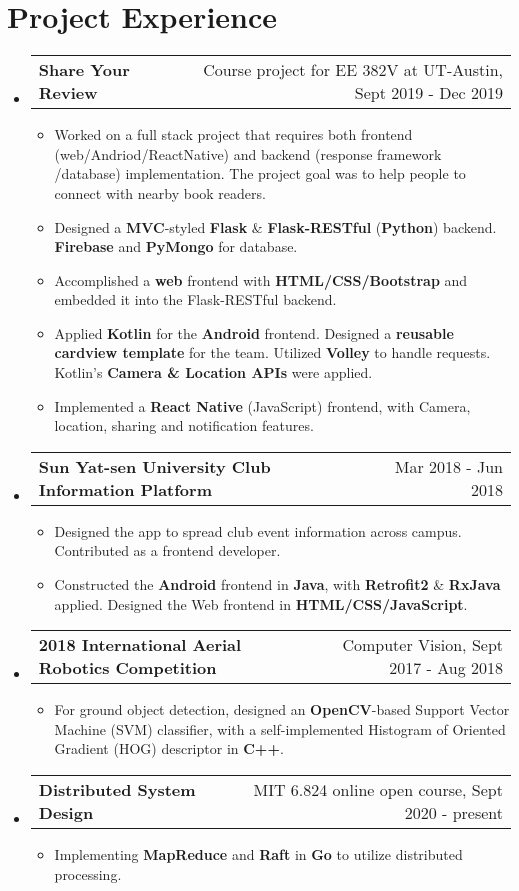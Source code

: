 \documentclass[letterpaper,11pt]{article}
\makeatletter
\newcommand{\resumeItem}[1]{
  \item\small{
    {#1 \vspace{-2pt}}
  }
}
\newcommand{\internSubheading}[2]{
	\vspace{-1pt}\item
	\begin{tabular*}{0.97\textwidth}[t]{l@{\extracolsep{\fill}}r}
		\textbf{#1} & #2 \\
	\end{tabular*}\vspace{-6.5pt}
}
\newcommand{\resumeSubHeadingListStart}{\begin{itemize}[leftmargin=*]}
\newcommand{\resumeSubHeadingListEnd}{\end{itemize}}
\newcommand{\resumeItemListStart}{\begin{itemize}}
\newcommand{\resumeItemListEnd}{\end{itemize}\vspace{-5pt}}
\makeatother
\begin{document}
\section{Project Experience}
	\resumeSubHeadingListStart
	\internSubheading
	{Share Your Review}{Course project for EE 382V at UT-Austin, Sept 2019 - Dec 2019}
	\resumeItemListStart
	\resumeItem
	{Worked on a full stack project that requires both frontend (web/Andriod/ReactNative) and backend (response framework /database) implementation. The project goal was to help people to connect with nearby book readers.}
	\resumeItem
	{Designed a \textbf{MVC}-styled \textbf{Flask} \& \textbf{Flask-RESTful} (\textbf{Python}) backend. \textbf{Firebase} and \textbf{PyMongo} for database. }
	\resumeItem
	{Accomplished a \textbf{web} frontend with \textbf{HTML/CSS/Bootstrap} and embedded it into the Flask-RESTful backend.}
	\resumeItem
	{Applied \textbf{Kotlin} for the \textbf{Android} frontend. Designed a \textbf{reusable cardview template} for the team. Utilized \textbf{Volley} to handle requests. Kotlin's \textbf{Camera \& Location APIs} were applied.  }
	\resumeItem
	{Implemented a \textbf{React Native} (JavaScript) frontend, with Camera, location, sharing and notification features. }
	\resumeItemListEnd
	
	\internSubheading{Sun Yat-sen University Club Information Platform}{Mar 2018 - Jun 2018}
	\resumeItemListStart
	\resumeItem{Designed the app to spread club event information across campus. Contributed as a frontend developer.}
	\resumeItem{Constructed the \textbf{Android} frontend in \textbf{Java}, with \textbf{Retrofit2} \& \textbf{RxJava} applied. Designed the Web frontend in \textbf{HTML/CSS/JavaScript}. }		
	\resumeItemListEnd
	\internSubheading{2018 International Aerial Robotics Competition}{Computer Vision, Sept 2017 - Aug 2018}
	\resumeItemListStart
	\resumeItem{For ground object detection, designed an \textbf{OpenCV}-based Support Vector Machine (SVM) classifier, with a self-implemented Histogram of Oriented Gradient (HOG) descriptor in \textbf{C++}. }
	\resumeItemListEnd
	\internSubheading{Distributed System Design}{MIT 6.824 online open course, Sept 2020 - present}
	\resumeItemListStart
	\resumeItem{Implementing \textbf{MapReduce} and \textbf{Raft} in \textbf{Go} to utilize distributed processing.  }		
	\resumeItemListEnd	  
  \resumeSubHeadingListEnd
  
\end{document}
